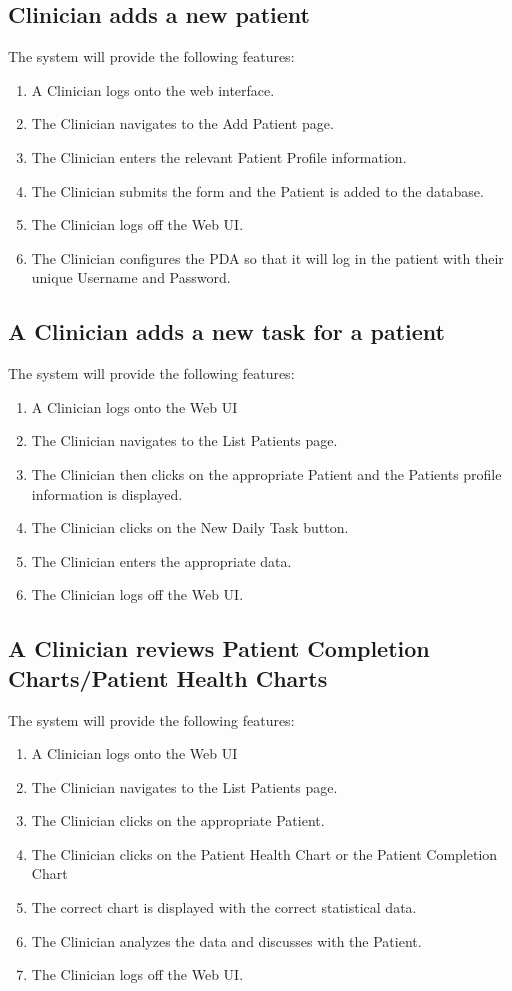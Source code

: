 \documentclass{article}
\begin{document}
\subsection{Clinician adds a new patient}	
The system will provide the following features:
\begin{enumerate}
\item A Clinician logs onto the web interface.
\item The Clinician navigates to the Add Patient page.
\item The Clinician enters the relevant Patient Profile information.
\item The Clinician submits the form and the Patient is added to the database.
\item The Clinician logs off the Web UI.
\item The Clinician configures the PDA so that it will log in the patient with their unique Username and Password.
\end{enumerate} 

\subsection{A Clinician adds a new task for a patient}	
The system will provide the following features:
\begin{enumerate}
\item A Clinician logs onto the Web UI
\item The Clinician navigates to the List Patients page.
\item The Clinician then clicks on the appropriate Patient and the Patients profile information is displayed.
\item The Clinician clicks on the New Daily Task button.
\item The Clinician enters the appropriate data.
\item The Clinician logs off the Web UI.
\end{enumerate} 

\subsection{A Clinician reviews Patient Completion Charts/Patient Health Charts}	
The system will provide the following features:
\begin{enumerate}
\item A Clinician logs onto the Web UI
\item The Clinician navigates to the List Patients page.
\item The Clinician clicks on the appropriate Patient.
\item The Clinician clicks on the Patient Health Chart or the Patient Completion Chart
\item The correct chart is displayed with the correct statistical data.
\item The Clinician analyzes the data and discusses with the Patient.
\item The Clinician logs off the Web UI.
\end{enumerate} 
\end{document}
